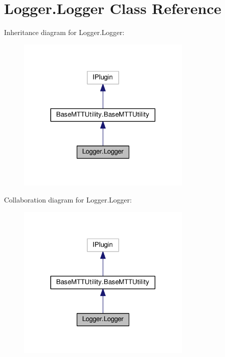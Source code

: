\hypertarget{classLogger_1_1Logger}{\section{Logger.\-Logger Class Reference}
\label{classLogger_1_1Logger}
}


Inheritance diagram for Logger.\-Logger\-:
\nopagebreak
\begin{figure}[H]
\begin{center}
\leavevmode
\includegraphics[width=236pt]{classLogger_1_1Logger__inherit__graph}
\end{center}
\end{figure}


Collaboration diagram for Logger.\-Logger\-:
\nopagebreak
\begin{figure}[H]
\begin{center}
\leavevmode
\includegraphics[width=236pt]{classLogger_1_1Logger__coll__graph}
\end{center}
\end{figure}
